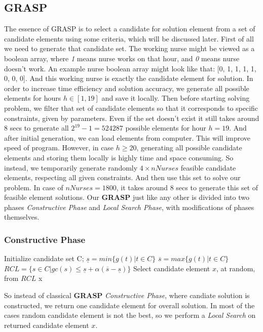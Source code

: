 \documentclass{article}
\newcommand\tab[1][1cm]{\hspace*{#1}}
\begin{document}
	\subsection{GRASP}
\tab The essence of GRASP is to select a candidate for solution element from a set of candidate elements using some criteria, which will be discussed later. First of all we need to generate that candidate set. The working nurse might be viewed as a boolean array, where \textit{1} means nurse works on that hour, and \textit{0} means nurse doesn't work. An example nurse boolean array might look like that: [0, 1, 1, 1, 1, 0, 0, 0]. And this working nurse is exactly the candidate element for solution. In order to increase time efficiency and solution accuracy, we generate all possible elements for hours $h \in [1,19]$ and save it locally. Then before starting solving problem, we filter that set of candidate elements so that it corresponds to specific constraints, given by parameters. Even if the set doesn't exist it still takes around 8 secs to generate all $2^{19} - 1 = 524287$ possible elements for hour $h = 19.$ And after initial generation, we can load elements from computer. This will improve speed of program. However, in case $h \geq 20$, generating all possible candidate elements and storing them locally is highly time and space consuming. So instead, we temporarily generate randomly $4 \times nNurses$ feasible candidate elements, respecting all given constraints. And then use this set to solve our problem. In case of $nNurses = 1800$, it takes around 8 secs to generate this set of feasible element solutions. Our \textbf{GRASP} just like any other is divided into two phases \textit{Constructive Phase} and \textit{Local Search Phase}, with modifications of phases themselves.
	\subsubsection{Constructive Phase}
		\begin{algorithmic}[1]
			\State Initialize candidate set C;
			\State $\underline{s} = min\{g(t) | t \in C \}$
			\State $\overline{s} = max\{g(t) | t \in C \}$
			\State $RCL = \{s \in C | gc(s) \leq \underline{s} + \alpha(\overline{s} - \underline{s}) \}$
			\State Select candidate element $x$, at random, from $RCL$
			\State \Return x 
		\EndFunction
		\end{algorithmic}
\tab So instead of classical \textbf{GRASP} \textit{Constructive Phase}, where candiate solution is constructed, we return one candidate element for overall solution. In most of the cases random candidate element is not the best, so we perform a \textit{Local Search} on returned candidate element $x.$\pagebreak
\end{document}
